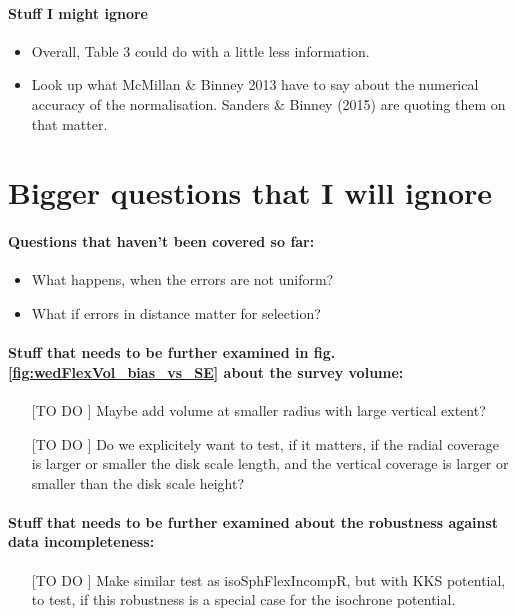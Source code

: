 \paragraph{Stuff I might ignore}
\begin{itemize}
\item Overall, Table 3 could do with a little less information.
\item Look up what McMillan \& Binney 2013 have to say about the numerical accuracy of the normalisation. Sanders \& Binney (2015) are quoting them on that matter.
\end{itemize}



\section{Bigger questions that I will ignore}

\paragraph{Questions that haven't been covered so far:}
\begin{itemize}
\item What happens, when the errors are not uniform?
\item What if errors in distance matter for selection?
\end{itemize}

\paragraph{Stuff that needs to be further examined in fig. \ref{fig:wedFlexVol_bias_vs_SE} about the survey volume:}
\begin{itemize}
\item[[TO DO]] Maybe add volume at smaller radius with large vertical extent?
\item[[TO DO]] Do we explicitely want to test, if it matters, if the radial coverage is larger or smaller the disk scale length, and the vertical coverage is larger or smaller than the disk scale height?
\end{itemize}

\paragraph{Stuff that needs to be further examined about the robustness against data incompleteness:}
\begin{itemize}
\item[[TO DO]] Make similar test as isoSphFlexIncompR, but with KKS potential, to test, if this robustness is a special case for the isochrone potential.
\end{itemize}


%



